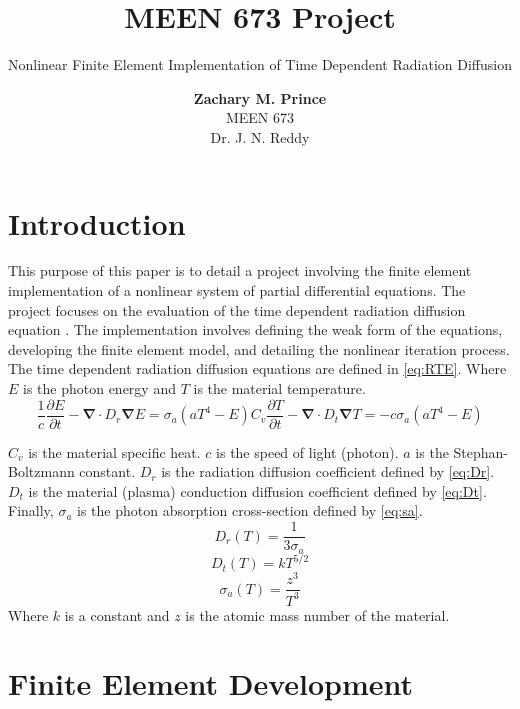 \documentclass[11pt]{scrartcl}
\title{\vspace{-30mm}\normalfont MEEN 673 Project}
\subtitle{\normalfont Nonlinear Finite Element Implementation of Time Dependent Radiation Diffusion}
\author{\normalsize \textbf{Zachary M. Prince} \\
		\normalsize MEEN 673 \\
		\normalsize Dr. J. N. Reddy}
\renewcommand{\div}{\bs{\nabla}\! \cdot \!}
\newcommand{\grad}{\bs{\nabla}}
\newcommand{\bs}[1]{\mathbf{#1}}
\newcommand{\be}{\begin{equation}}
\newcommand{\ee}{\end{equation}}
\begin{document}
\maketitle
{}


\section{\bf Introduction}

This purpose of this paper is to detail a project involving the finite element implementation of a nonlinear system of partial differential equations.  The project focuses on the evaluation of the time dependent radiation diffusion equation \cite{Mousseau_2000,Knoll_1999}.  The implementation involves defining the weak form of the equations, developing the finite element model, and detailing the nonlinear iteration process. \\

The time dependent radiation diffusion equations are defined in \eqref{eq:RTE}.  Where $E$ is the photon energy and $T$ is the material temperature.
\begin{subequations}
\be 
\frac{1}{c}\frac{\partial E}{\partial t} - \div D_r \grad E = \sigma_a\left(aT^4-E\right)
\ee
\be 
C_v \frac{\partial T}{\partial t} - \div D_t \grad T = -c\sigma_a\left(aT^4-E\right)
\ee
\label{eq:RTE}
\end{subequations}

$C_v$ is the material specific heat. $c$ is the speed of light (photon). $a$ is the Stephan-Boltzmann constant. $D_r$ is the radiation diffusion coefficient defined by \eqref{eq:Dr}.  $D_t$ is the material (plasma) conduction diffusion coefficient defined by \eqref{eq:Dt}. Finally, $\sigma_a$ is the photon absorption cross-section defined by \eqref{eq:sa}.
\be
D_r(T) = \frac{1}{3\sigma_a}
\label{eq:Dr}
\ee
\be
D_t(T) = kT^{5/2}
\label{eq:Dt}
\ee
\be
\sigma_a(T) = \frac{z^3}{T^3}
\label{eq:sa}
\ee
Where $k$ is a constant and $z$ is the atomic mass number of the material. 


\section{\bf Finite Element Development}
\end{document}
